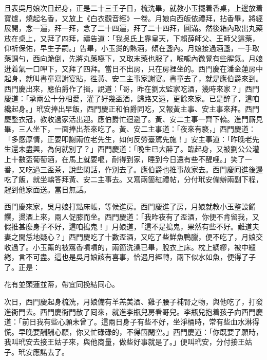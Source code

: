 且表吳月娘次日起身，正是二十三壬子日，梳洗畢，就教小玉擺着香桌，上邊放着寶爐，燒起名香，又放上《白衣觀音經》一卷。月娘向西皈依禮拜，拈香畢，將經展開，念一遍，拜一拜，念了二十四遍，拜了二十四拜，圓滿。然後箱內取出丸藥放在桌上，又拜了四拜，禱告道：「我吳氏上靠皇天，下賴薛師父、王師父這藥，{}仰祈保佑，早生子嗣。」告畢，小玉燙的熱酒，傾在盞內。月娘接過酒盞，一手取藥調勻，西向跪倒，先將丸藥嚥下，又取末藥也服了，喉嚨內微覺有些腥氣。{}月娘迸着氣一口呷下，{}又拜了四拜。當日不出房，只在房裡坐的。西門慶在潘金蓮房中起身，就叫書童寫謝宴貼，徃黃、安二主事家謝宴。書童去了，就是應伯爵來到。西門慶出來，應伯爵作了揖，說道：「哥，昨在劉太監家吃酒，幾時來家？」西門慶道：「承兩公十分相愛，灌了好幾盃酒，歸路又遠，更餘來家。已是醉了，這咱纔起身。」玳安捧出早飯，西門慶正和伯爵同吃，又報黃主事、安主事來拜。西門慶整衣冠，教收過家活出迎。應伯爵忙迴避了。黃、安二主事一齊下轎。進門厮見畢，三人坐下，一面捧出茶來吃了。黃、安二主事道：「夜來有褻，」西門慶道：「多感厚情，正要叩謝兩位老先生，如何反勞臺駕先施！」安主事道：「昨晚老先生還未盡興，為何就別了？」西門慶道：「晚生已大醉了。臨起身，又被劉公公灌上十數盃葡萄酒，在馬上就要嘔，耐得到家，睡到今日還有些不醒哩。」笑了一番，又吃過三盃茶，說些閑話，作別去了。應伯爵也推事故家去。西門慶囘進後邊吃了飯，就坐轎答拜黃、安二主事去。又寫兩箇紅禮帖，分付玳安備辦兩副下程，趕到他家面送。當日無話。

西門慶來家，吳月娘打點床帳，等候進房。西門慶進了房，月娘就教小玉整設餚饌，燙酒上來，兩人促膝而坐。西門慶道：「我昨夜有了盃酒，你便不肯留我，又假推甚麼身子不好，這咱搗鬼！」月娘道，「這不是搗鬼，果然有些不好。難道夫妻之間恁地疑心？」西門慶吃了十數盃酒，又吃了些鮮魚鴨臘，便不吃了，月娘交收過了。小玉薰的被窩香噴噴的，兩箇洗澡已畢，脫衣上床。枕上綢繆，被中繾綣，言不可盡。這也是吳月娘該有喜事，恰遇月經轉，兩下似水如魚，便得了子了。{}正是：

\begin{myquote}
花有並頭蓮並蒂，帶宜同挽結同心。
\end{myquote}

次日，西門慶起身梳洗，月娘備有羊羔美酒、雞子腰子補腎之物，與他吃了，打發進衙門去。西門慶衙門散了囘來，就進李瓶兒房看哥兒。李瓶兒抱着孩子向西門慶道：「前日我有些心願未曾了。這兩日身子有些不好，坐淨桶時，常有些血水淋得慌。早晚要酬酬心願，你又忙碌碌的，不得箇閑空。」西門慶道：「你既要了願時，我叫玳安去接王姑子來，{}與他商量，做些好事就是了。」便叫玳安，分付接王姑子。玳安應諾去了。

